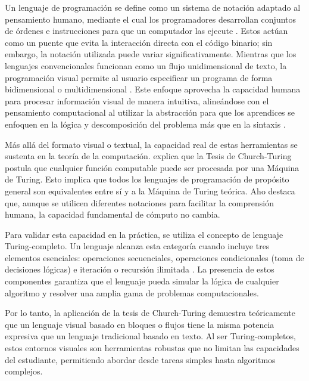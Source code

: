 
Un lenguaje de programación se define como un sistema de notación adaptado al pensamiento humano, mediante el cual los programadores desarrollan conjuntos de órdenes e instrucciones para que un computador las ejecute \cite{trigo2004}. Estos actúan como un puente que evita la interacción directa con el código binario; sin embargo, la notación utilizada puede variar significativamente. Mientras que los lenguajes convencionales funcionan como un flujo unidimensional de texto, la programación visual permite al usuario especificar un programa de forma bidimensional o multidimensional . Este enfoque aprovecha la capacidad humana para procesar información visual de manera intuitiva, alineándose con el pensamiento computacional al utilizar la abstracción para que los aprendices se enfoquen en la lógica y descomposición del problema más que en la sintaxis \cite{wing2006}.

Más allá del formato visual o textual, la capacidad real de estas herramientas se sustenta en la teoría de la computación.  explica que la Tesis de Church-Turing postula que cualquier función computable puede ser procesada por una Máquina de Turing. Esto implica que todos los lenguajes de programación de propósito general son equivalentes entre sí y a la Máquina de Turing teórica. Aho destaca que, aunque se utilicen diferentes notaciones para facilitar la comprensión humana, la capacidad fundamental de cómputo no cambia.

Para validar esta capacidad en la práctica, se utiliza el concepto de lenguaje Turing-completo. Un lenguaje alcanza esta categoría cuando incluye tres elementos esenciales: operaciones secuenciales, operaciones condicionales (toma de decisiones lógicas) e iteración o recursión ilimitada \cite{zeil2024}. La presencia de estos componentes garantiza que el lenguaje pueda simular la lógica de cualquier algoritmo y resolver una amplia gama de problemas computacionales.

Por lo tanto, la aplicación de la tesis de Church-Turing demuestra teóricamente que un lenguaje visual basado en bloques o flujos tiene la misma potencia expresiva que un lenguaje tradicional basado en texto. Al ser Turing-completos, estos entornos visuales son herramientas robustas que no limitan las capacidades del estudiante, permitiendo abordar desde tareas simples hasta algoritmos complejos.


